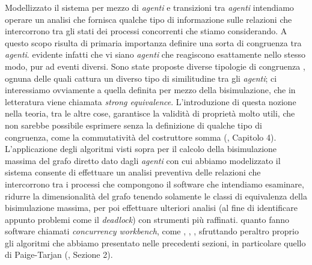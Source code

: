 Modellizzato il sistema per mezzo di \emph{agenti} e transizioni tra \emph{agenti} intendiamo operare un analisi che fornisca qualche tipo di informazione sulle relazioni che intercorrono tra gli stati dei processi concorrenti che stiamo considerando. A questo scopo risulta di primaria importanza definire una sorta di congruenza tra \emph{agenti}. \accente evidente infatti che vi siano \emph{agenti} che reagiscono esattamente nello stesso modo, pur ad eventi diversi. Sono state proposte diverse tipologie di congruenza \cite{kanellakis}, ognuna delle quali cattura un diverso tipo di similitudine tra gli \emph{agenti}; ci interessiamo ovviamente a quella definita per mezzo della bisimulazione, che in letteratura viene chiamata \emph{strong equivalence}. L'introduzione di questa nozione nella teoria, tra le altre cose, garantisce la validità di proprietà molto utili, che non sarebbe possibile esprimere senza la definizione di qualche tipo di congruenza, come la commutatività del costruttore somma (\cite{intro_calculus}, Capitolo 4). L'applicazione degli algoritmi visti sopra per il calcolo della bisimulazione massima del grafo diretto dato dagli \emph{agenti} con cui abbiamo modelizzato il sistema consente di effettuare un analisi preventiva delle relazioni che intercorrono tra i processi che compongono il software che intendiamo esaminare, ridurre la dimensionalità del grafo tenendo solamente le classi di equivalenza della bisimulazione massima, per poi effettuare ulteriori analisi (al fine di identificare appunto problemi come il \emph{deadlock}) con strumenti più raffinati. \accente quanto fanno software chiamati \emph{concurrency workbench}, come \cite{ncsu}, \cite{caal}, \cite{cwnc}, sfruttando peraltro proprio gli algoritmi che abbiamo presentato nelle precedenti sezioni, in particolare quello di Paige-Tarjan (\cite{dovier}, Sezione 2).
